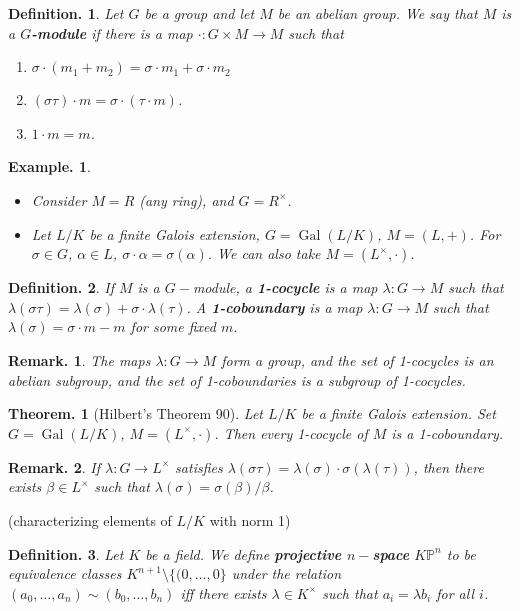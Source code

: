 \documentclass[11pt, a4paper]{memoir}
\newcommand{\mbf}[1]{{\boldmath\bfseries #1}}
\theoremstyle{change}
\newtheorem{theorem}{Theorem.}[section]
\theoremstyle{plain}
\theoremstyle{nonumberplain}
\newtheorem{definition}{Definition.}
\newtheorem{example}{Example.}
\newtheorem{remark}{Remark.}
\DeclareMathOperator{\Gal}{Gal}
\numberwithin{equation}{section}
\begin{document}
\begin{definition}
    Let $G$ be a group and let $M$ be an abelian group.
    We say that $M$ is a \mbf{$G$-module} if there is a map $\cdot:G\times M\to M$ such that
    \begin{enumerate}[nl,r]
        \item $\sigma\cdot(m_1+m_2)=\sigma\cdot m_1+\sigma\cdot m_2$
        \item $(\sigma\tau)\cdot m=\sigma\cdot(\tau\cdot m)$.
        \item $1\cdot m=m$.
    \end{enumerate}
\end{definition}
\begin{example}
    \begin{itemize}[nl]
        \item Consider $M=R$ (any ring), and $G=R^\times$.
        \item Let $L/K$ be a finite Galois extension, $G=\Gal(L/K)$, $M=(L,+)$.
            For $\sigma\in G$, $\alpha\in L$, $\sigma\cdot\alpha=\sigma(\alpha)$.
            We can also take $M=(L^\times,\cdot)$.
    \end{itemize}
\end{example}
\begin{definition}
    If $M$ is a $G-$module, a \mbf{1-cocycle} is a map $\lambda:G\to M$ such that $\lambda(\sigma\tau)=\lambda(\sigma)+\sigma\cdot\lambda(\tau)$.
    A \mbf{1-coboundary} is a map $\lambda:G\to M$ such that $\lambda(\sigma)=\sigma\cdot m-m$ for some fixed $m$.
\end{definition}
\begin{remark}
    The maps $\lambda:G\to M$ form a group, and the set of 1-cocycles is an abelian subgroup, and the set of 1-coboundaries is a subgroup of 1-cocycles.
\end{remark}
\begin{theorem}[Hilbert's Theorem 90]
    Let $L/K$ be a finite Galois extension.
    Set $G=\Gal(L/K)$, $M=(L^\times,\cdot)$.
    Then every 1-cocycle of $M$ is a 1-coboundary.
\end{theorem}
\begin{remark}
    If $\lambda:G\to L^\times$ satisfies $\lambda(\sigma\tau)=\lambda(\sigma)\cdot\sigma(\lambda(\tau))$, then there exists $\beta\in L^\times$ such that $\lambda(\sigma)=\sigma(\beta)/\beta$.
\end{remark}
(characterizing elements of $L/K$ with norm 1)
\begin{definition}
    Let $K$ be a field.
    We define \mbf{projective $n-$space} $K\mathbb{P}^n$ to be equivalence classes $K^{n+1}\setminus\{(0,\ldots,0\}$ under the relation $(a_0,\ldots,a_n)\sim(b_0,\ldots,b_n)$ iff there exists $\lambda\in K^\times$ such that $a_i=\lambda b_i$ for all $i$.
\end{definition}
\end{document}
